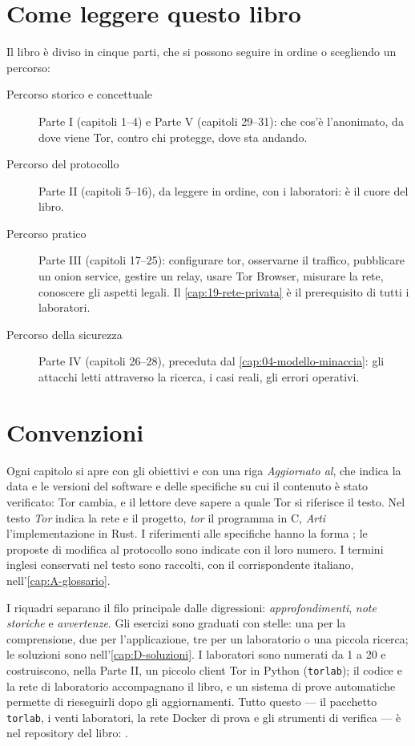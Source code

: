 \section*{Come leggere questo libro}

Il libro è diviso in cinque parti, che si possono seguire in ordine o scegliendo un percorso:
\begin{description}
  \item[Percorso storico e concettuale] Parte I (capitoli 1--4) e Parte V (capitoli 29--31): che cos'è l'anonimato, da dove viene Tor, contro chi protegge, dove sta andando.
  \item[Percorso del protocollo] Parte II (capitoli 5--16), da leggere in ordine, con i laboratori: è il cuore del libro.
  \item[Percorso pratico] Parte III (capitoli 17--25): configurare tor, osservarne il traffico, pubblicare un onion service, gestire un relay, usare Tor Browser, misurare la rete, conoscere gli aspetti legali. Il \cref{cap:19-rete-privata} è il prerequisito di tutti i laboratori.
  \item[Percorso della sicurezza] Parte IV (capitoli 26--28), preceduta dal \cref{cap:04-modello-minaccia}: gli attacchi letti attraverso la ricerca, i casi reali, gli errori operativi.
\end{description}

\section*{Convenzioni}

Ogni capitolo si apre con gli obiettivi e con una riga \emph{Aggiornato al}, che indica la data e le versioni del software e delle specifiche su cui il contenuto è stato verificato: Tor cambia, e il lettore deve sapere a quale Tor si riferisce il testo. Nel testo \emph{Tor} indica la rete e il progetto, \emph{tor} il programma in C, \emph{Arti} l'implementazione in Rust. I riferimenti alle specifiche hanno la forma ; le proposte di modifica al protocollo sono indicate con il loro numero. I termini inglesi conservati nel testo sono raccolti, con il corrispondente italiano, nell'\cref{cap:A-glossario}.

I riquadri separano il filo principale dalle digressioni: \emph{approfondimenti}, \emph{note storiche} e \emph{avvertenze}. Gli esercizi sono graduati con stelle: una per la comprensione, due per l'applicazione, tre per un laboratorio o una piccola ricerca; le soluzioni sono nell'\cref{cap:D-soluzioni}. I laboratori sono numerati da 1 a 20 e costruiscono, nella Parte II, un piccolo client Tor in Python (\texttt{torlab}); il codice e la rete di laboratorio accompagnano il libro, e un sistema di prove automatiche permette di rieseguirli dopo gli aggiornamenti. Tutto questo --- il pacchetto \texttt{torlab}, i venti laboratori, la rete Docker di prova e gli strumenti di verifica --- \`e nel repository del libro: \repolibro.

